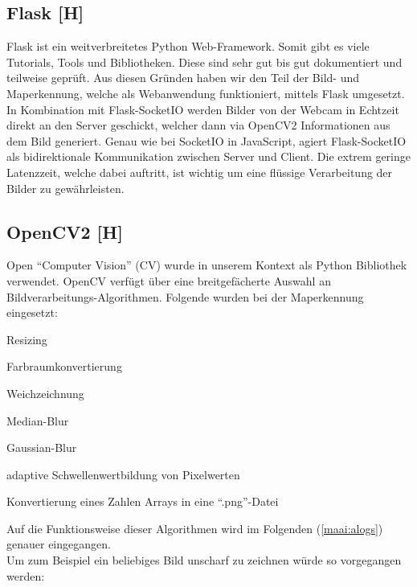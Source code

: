 \subsection{Flask [H]}
Flask ist ein weitverbreitetes Python Web-Framework. Somit gibt es viele Tutorials,
Tools und Bibliotheken. Diese sind sehr gut bis gut dokumentiert und teilweise geprüft.
Aus diesen Gründen haben wir den Teil der Bild- und Maperkennung, welche
als Webanwendung funktioniert, mittels Flask umgesetzt. In Kombination mit Flask-SocketIO werden Bilder von der Webcam
in Echtzeit direkt an den Server geschickt, welcher dann via OpenCV2 Informationen aus dem Bild
generiert. Genau wie bei SocketIO in JavaScript, agiert Flask-SocketIO als bidirektionale
Kommunikation zwischen Server und Client. Die extrem geringe Latenzzeit, welche dabei auftritt,
ist wichtig um eine flüssige Verarbeitung der Bilder zu gewährleisten.

\subsection{OpenCV2 [H]}
Open ``Computer Vision'' (CV) wurde in unserem Kontext als Python Bibliothek verwendet. OpenCV verfügt über eine
breitgefächerte Auswahl an Bildverarbeitungs-Algorithmen.
Folgende wurden bei der Maperkennung eingesetzt:
\begin{compactitem}
    \item Resizing
    \item Farbraumkonvertierung
    \item Weichzeichnung
    \begin{compactitem}
        \item Median-Blur
        \item Gaussian-Blur
    \end{compactitem}
    \item adaptive Schwellenwertbildung von Pixelwerten
    \item Konvertierung eines Zahlen Arrays in eine ``.png''-Datei
\end{compactitem}
Auf die Funktionsweise dieser Algorithmen wird im Folgenden (\ref{maai:alogs}) genauer eingegangen.
\\
Um zum Beispiel ein beliebiges Bild unscharf zu zeichnen würde so vorgegangen werden:
\\


